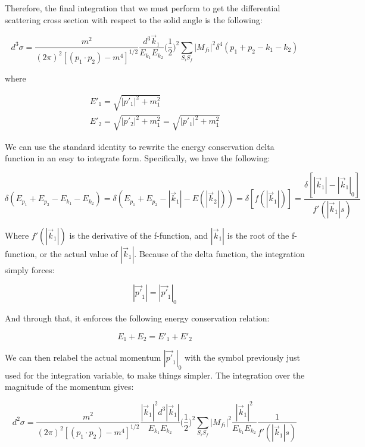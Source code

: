 \documentclass[a4]{article}
\begin{document}
    Therefore, the final integration that we must perform to get the differential scattering cross section with respect to the solid angle is the following:

    \begin{equation}
        d^3 \sigma = \frac{m^2}{(2 \pi)^2 [(p_1 \cdot p_2) - m^4]^{1/2}} \frac{d^3 \vec{k}_1}{E_{k_1} E_{k_2}} \bigg( \frac{1}{2} \bigg)^2 \sum_{S_i S_f} |M_{fi}|^2 \delta^4 (p_1 + p_2 - k_1 - k_2)
    \end{equation}

    where

    \begin{eqnarray}
        E'_1 = \sqrt{|p'_1|^2 + m_1^2} \\
        E'_2 = \sqrt{|p'_2|^2 + m_1^2} = \sqrt{|p'_1|^2 + m_1^2}
    \end{eqnarray}

    We can use the standard identity to rewrite the energy conservation delta function in an easy to integrate form. Specifically, we have the following: 

    \begin{equation}
        \delta (E_{p_1} + E_{p_2} - E_{k_1} - E_{k_2}) = \delta (E_{p_1} + E_{p_2} - |\vec{k}_1| - E (|\vec{k}_2|) ) = \delta [f (|\vec{k}_1|)] = \frac{\delta [|\vec{k}_1| - |\vec{k}_1|_0]}{f' (|\vec{k}_1|s)}
    \end{equation}

    Where $f'(|\vec{k}_1|)$ is the derivative of the f-function, and $|\vec{k}_1|$ is the root of the f-function, or the actual value of $|\vec{k}_1|$. Because of the delta function, the integration simply forces:

    \begin{equation}
        |\vec{p'}_1| = |\vec{p'}_1|_0
    \end{equation}

    And through that, it enforces the following energy conservation relation:

    \begin{equation}
        E_1 + E_2 = E'_1 + E'_2
    \end{equation}

    We can then relabel the actual momentum $|\vec{p'}_1|_0$ with the symbol previously just used for the integration variable, to make things simpler. The integration over the magnitude of the momentum gives: 

    \begin{equation}
        d^2 \sigma = \frac{m^2}{(2 \pi)^2 [(p_1 \cdot p_2) - m^4]^{1/2}} \frac{|\vec{k}_1|^2 d^3 |\vec{k}_1|}{E_{k_1} E_{k_2}} \bigg( \frac{1}{2} \bigg)^2 \sum_{S_i S_f} |M_{fi}|^2 \frac{|\vec{k}_1|^2}{E_{k_1} E_{k_2}} \frac{1}{f' (|\vec{k}_1|s)}
    \end{equation}
\end{document}
